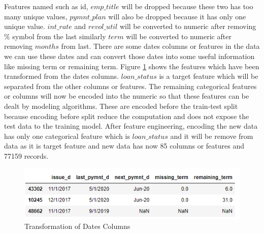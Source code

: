 \documentclass[12pt]{article}
\begin{document}
 Features named such as id, $emp\_title$ will be dropped because these two has too many unique values, $pymnt\_plan$ will also be dropped because it has only one unique value. $int\_rate$ and $revol\_util$ will be converted to numeric after removing $\%$ symbol from the last similarly $term$ will be converted to numeric after removing $months$ from last. There are some dates columns or features in the data we can use these dates and can convert those dates into some useful information like missing term or remaining term. Figure \ref{fig:dates} shows the features which have been transformed from the dates columns. $loan\_status$ is a target feature which will be separated from the other columns or features. The remaining categorical features or columns will now be encoded into the numeric so that these features can be dealt by modeling algorithms. These are encoded before the train-test split because encoding before split reduce the computation and does not expose the test data to the training model. After feature engineering, encoding the new data has only one categorical feature which is $loan\_status$ and it will be remove from data as it is target feature and new data has now 85 columns or features and 77159 records.

\begin{figure}[h!]
	\centering
	\includegraphics{dates.png}
	\caption{Transformation of Dates Columns}
	\label{fig:dates}
\end{figure}
\end{document}
